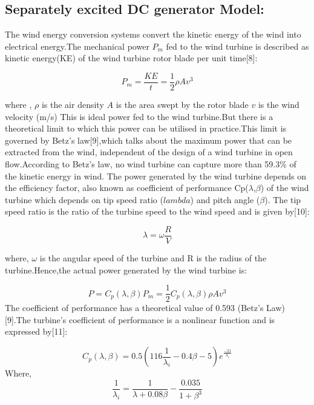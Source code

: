 \subsection{Separately excited DC generator Model:}
The wind energy conversion systems convert the kinetic energy of the wind into electrical energy.The mechanical power $P_m$ fed to the wind turbine is described as kinetic energy(KE) of the wind turbine rotor blade per unit time[8]:


\begin{equation}
P_m =\frac{KE}{t} = \frac{1}{2} \rho  Av^3
\end{equation}

where ,
$\rho$ is the air density
$A$ is the area swept by the rotor blade 
$v$ is the wind velocity (m/s)
This is ideal power fed to the wind turbine.But there is a theoretical limit to which this power can be utilised in practice.This limit is governed by Betz’s law[9],which talks about the maximum power that can be extracted from the wind, independent of the design of a wind turbine in open flow.According to Betz's law, no wind turbine can capture more than 59.3\% of the kinetic energy in wind.
The power generated by the wind turbine depends on the efficiency factor, also known as coefficient of  performance Cp($\lambda $,$\beta$) of the wind turbine which depends on  tip speed ratio ($lambda$) and pitch angle ($\beta$).
The tip speed ratio is the ratio of  the turbine speed to the wind speed and is given by[10]:

\begin{equation}
\lambda=\omega \frac{R}{V}
\end{equation}

where, $\omega$ is the angular speed of the turbine and R is the radius of the turbine.Hence,the actual power generated by the wind turbine is:

\begin{equation}
P=C_p(\lambda,\beta)P_m = \frac{1}{2}C_p(\lambda,\beta) \rho  Av^3
\end{equation}
The coefficient of  performance has a theoretical value of 0.593 (Betz’s Law)[9].The turbine’s coefficient of performance is a nonlinear function and is expressed by[11]: 

\begin{equation}
C_p(\lambda,\beta) = 0.5 ( 116 \frac{1}{\lambda_i} - 0.4 \beta - 5) e^\frac{-21}{\lambda_i}
\end{equation}
Where,
\begin{equation}
\frac{1}{\lambda_i} = \frac {1}{\lambda + 0.08 \beta} - \frac{0.035}{1+\beta^3}
\end{equation}

